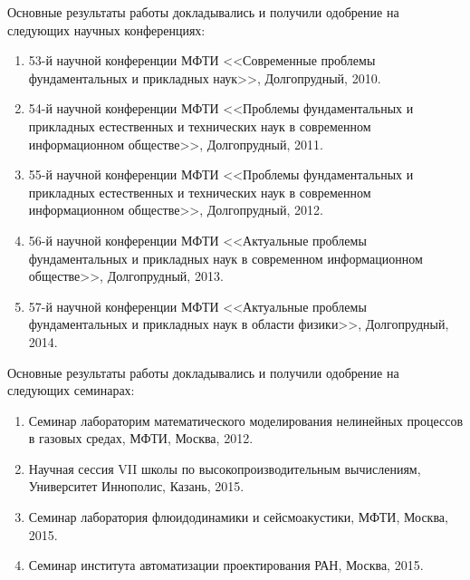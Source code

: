 Основные результаты работы докладывались и получили одобрение на следующих научных конференциях:
\begin{enumerate}
\item 53-й научной конференции МФТИ <<Современные проблемы фундаментальных и прикладных наук>>, Долгопрудный, 2010.
\item 54-й научной конференции МФТИ <<Проблемы фундаментальных и прикладных естественных и технических наук в современном информационном обществе>>, Долгопрудный, 2011.
\item 55-й научной конференции МФТИ <<Проблемы фундаментальных и прикладных естественных и технических наук в современном информационном обществе>>, Долгопрудный, 2012.
\item 56-й научной конференции МФТИ <<Актуальные проблемы фундаментальных и прикладных наук в современном информационном обществе>>, Долгопрудный, 2013.
\item 57-й научной конференции МФТИ <<Актуальные проблемы фундаментальных и прикладных наук в области физики>>, Долгопрудный, 2014.
\end{enumerate}

Основные результаты работы докладывались и получили одобрение на следующих семинарах:
\begin{enumerate}
\item Семинар лабораторим математического моделирования нелинейных процессов в газовых средах, МФТИ, Москва, 2012.
\item Научная сессия VII школы по высокопроизводительным вычислениям, Университет Иннополис, Казань, 2015.
\item Семинар лаборатория флюидодинамики и сейсмоакустики, МФТИ, Москва, 2015.
\item Семинар института автоматизации проектирования РАН, Москва, 2015.
\end{enumerate}
